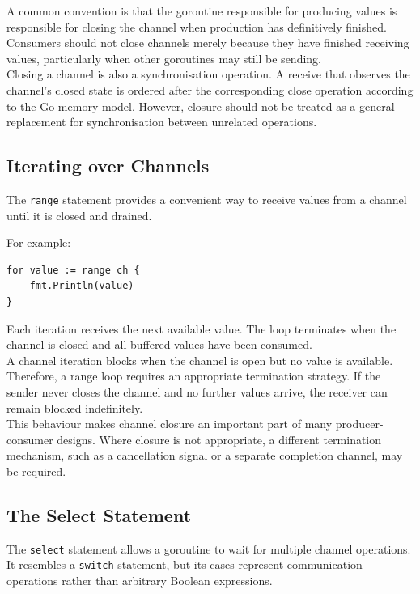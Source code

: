 A common convention is that the goroutine responsible for producing values is responsible for closing the channel when production has definitively finished. Consumers should not close channels merely because they have finished receiving values, particularly when other goroutines may still be sending.\\

Closing a channel is also a synchronisation operation. A receive that observes the channel's closed state is ordered after the corresponding close operation according to the Go memory model. However, closure should not be treated as a general replacement for synchronisation between unrelated operations.\\

\subsection{Iterating over Channels}

The \texttt{range} statement provides a convenient way to receive values from a channel until it is closed and drained.

For example:

\begin{lstlisting}
for value := range ch {
    fmt.Println(value)
}
\end{lstlisting}

Each iteration receives the next available value. The loop terminates when the channel is closed and all buffered values have been consumed.\\

A channel iteration blocks when the channel is open but no value is available. Therefore, a range loop requires an appropriate termination strategy. If the sender never closes the channel and no further values arrive, the receiver can remain blocked indefinitely.\\

This behaviour makes channel closure an important part of many producer-consumer designs. Where closure is not appropriate, a different termination mechanism, such as a cancellation signal or a separate completion channel, may be required.

\subsection{The Select Statement}

The \texttt{select} statement allows a goroutine to wait for multiple channel operations. It resembles a \texttt{switch} statement, but its cases represent communication operations rather than arbitrary Boolean expressions.\\

